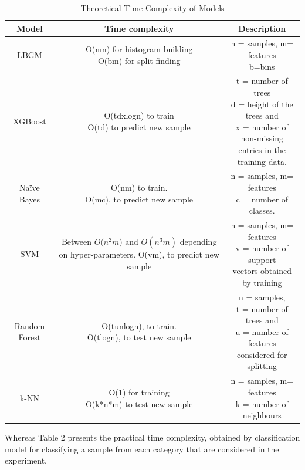 \documentclass[12pt]{article}
\begin{document}
\begin{table}[ht]
\centering

\caption{Theoretical Time Complexity of Models}
\begin{tabular}{|c|c|c|}
\hline 
Model & Time complexity & Description \\ 
\hline 
LBGM & \makecell{O(nm) for histogram building \\
 O(bm) for split finding}
 & \makecell{n = samples, m= features\\
b=bins}
 \\ 
\hline 
XGBoost & \makecell{O(tdxlogn) to train\\
O(td) to predict new sample}
 & \makecell{t = number of trees\\
d = height of the trees and \\
x = number of non-missing\\ entries in the training data.}
 \\ 
\hline 
Naïve Bayes & \makecell{O(nm) to train. \\
O(mc), to predict new sample}
 & \makecell{n = samples, m= features\\
c = number of classes.}
 \\ 
\hline 
SVM & \makecell{Between $O(n^2m$) and $O(n^3m)$ \\depending on hyper-parameters.\\
O(vm), to predict new sample }
 & \makecell{n = samples, m= features\\
v = number of support \\vectors obtained by training}
 \\ 
\hline 
Random Forest &\makecell{ O(tunlogn), to train.\\
O(tlogn), to test new sample}
 & \makecell{n = samples,\\ t = number of trees and\\ u = number of features \\considered for splitting} \\ 
\hline 
k-NN & \makecell{O(1) for training\\
O(k*n*m) to test new sample}
 & \makecell{n = samples, m= features\\
k = number of neighbours}
 \\ 
\hline 
\end{tabular} 
\label{tab:caption}
\end{table}


Whereas Table 2 presents the practical time complexity, obtained by classification model for classifying a sample from each category that are considered in the experiment. 
\end{document}
